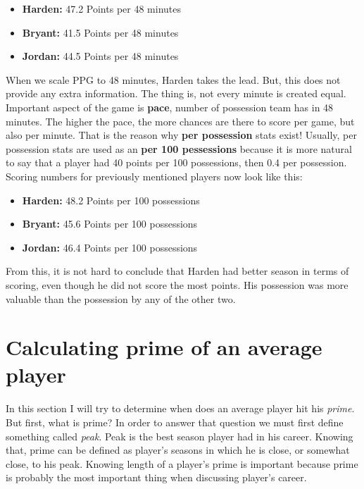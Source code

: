 \documentclass[a4paper]{article}
\begin{document}
\begin{itemize}
	\item \textbf{Harden:} 47.2 Points per 48 minutes
	\item \textbf{Bryant:} 41.5 Points per 48 minutes
	\item \textbf{Jordan:} 44.5 Points per 48 minutes
\end{itemize}

When we scale PPG to 48 minutes, Harden takes the lead. But, this does not provide any extra information. The thing is, not every minute is created equal. Important aspect of the game is \textbf{pace}, number of possession team has in 48 minutes. The higher the pace, the more chances are there to score per game, but also per minute. That is the reason why \textbf{per possession} stats exist! Usually, per possession stats are used as an \textbf{per 100 pessessions} because it is more natural to say that a player had 40 points per 100 possessions, then 0.4 per possession. Scoring numbers for previously mentioned players now look like this:

\begin{itemize}
	\item \textbf{Harden:} 48.2 Points per 100 possessions
	\item \textbf{Bryant:} 45.6 Points per 100 possessions
	\item \textbf{Jordan:} 46.4 Points per 100 possessions
\end{itemize}

From this, it is not hard to conclude that Harden had better season in terms of scoring, even though he did not score the most points. His possession was more valuable than the possession by any of the other two.

\section{Calculating prime of an average player}
\label{sec:prime}

In this section I will try to determine when does an average player hit his \textit{prime}. But first, what is prime? In order to answer that question we must first define something called \textit{peak}. Peak is the best season player had in his career. Knowing that, prime can be defined as player's seasons in which he is close, or somewhat close, to his peak. Knowing length of a player's prime is important because prime is probably the most important thing when discussing player's career.
\end{document}
